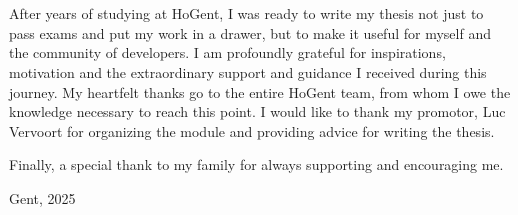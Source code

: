 
\chapter*{}%
\label{ch:voorwoord}


After years of studying at HoGent, I was ready to write my thesis not just to pass exams and put my work in a drawer, but to make it useful for myself and the community of developers. I am profoundly grateful for inspirations, motivation and the extraordinary support and guidance I received during this journey. My heartfelt thanks go to the entire HoGent team, from whom I owe the knowledge necessary to reach this point.
I would like to thank my promotor, Luc Vervoort for organizing the module and providing advice for writing the thesis.\newline


Finally, a special thank to my family for always supporting and encouraging me.

\begin{flushright}
    Gent, 2025
\end{flushright}